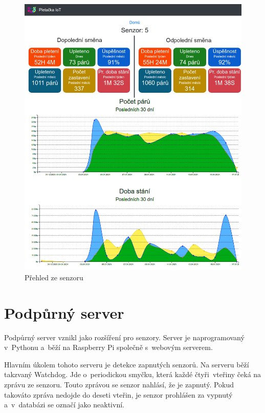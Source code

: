 \documentclass{template/socthesis}
\begin{document}
\begin{figure}[htbp]
    \centering
    \includegraphics[width=\textwidth]{img/prehled.png}
    \caption{Přehled ze senzoru}
    \label{fig:webSenzory}
\end{figure}


\section{Podpůrný server}
Podpůrný server vznikl jako rozšíření pro senzory.
Server je naprogramovaný v~Pythonu a~běží na Raspberry Pi společně s~webovým serverem.\newline

Hlavním úkolem tohoto serveru je detekce zapnutých senzorů.
Na serveru běží takzvaný Watchdog.
Jde o~periodickou smyčku, která každé čtyři~vteřiny čeká na zprávu ze senzoru.
Touto zprávou se senzor nahlásí, že je zapnutý. Pokud takováto zpráva nedojde do deseti vteřin, je senzor prohlášen za vypnutý a~v~databázi se označí jako neaktivní.
\end{document}
